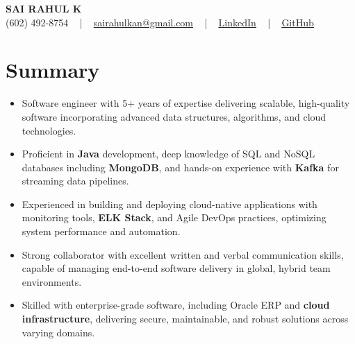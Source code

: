 \documentclass[letterpaper,11pt]{article}
\newcommand{\resumeItem}[1]{
  \item\footnotesize{
    {#1 \vspace{-2pt}}
  }
}
\newcommand{\resumeItemListStart}{\begin{itemize}[leftmargin=*]}
\newcommand{\resumeItemListEnd}{\end{itemize}\vspace{-5pt}}
\begin{document}
\begin{center}
    {\fontsize{14pt}{12pt}\selectfont \textbf{\MakeUppercase{Sai Rahul K}}}\\ \vspace{2pt}
    \fontsize{10pt}{12pt}\selectfont (602) 492-8754 ~ | ~ \href{mailto:sairahulkan@gmail.com}{sairahulkan@gmail.com} ~ | ~
    \href{https://www.linkedin.com/in/rq123/}{\color{blue}\underline{LinkedIn}} ~ | ~
    \href{https://github.com/kanrahuldo}{\color{blue}\underline{GitHub}}~
    \vspace{-8pt}
\end{center}

\section{Summary}
\fontsize{9pt}{10pt}\selectfont
\resumeItemListStart
    \resumeItem{Software engineer with 5+ years of expertise delivering scalable, high-quality software incorporating advanced data structures, algorithms, and cloud technologies.}
    \resumeItem{Proficient in \textbf{Java} development, deep knowledge of SQL and NoSQL databases including \textbf{MongoDB}, and hands-on experience with \textbf{Kafka} for streaming data pipelines.}
    \resumeItem{Experienced in building and deploying cloud-native applications with monitoring tools, \textbf{ELK Stack}, and Agile DevOps practices, optimizing system performance and automation.}
    \resumeItem{Strong collaborator with excellent written and verbal communication skills, capable of managing end-to-end software delivery in global, hybrid team environments.}
    \resumeItem{Skilled with enterprise-grade software, including Oracle ERP and \textbf{cloud infrastructure}, delivering secure, maintainable, and robust solutions across varying domains.}
\resumeItemListEnd
\vspace{-6pt}
\end{document}
